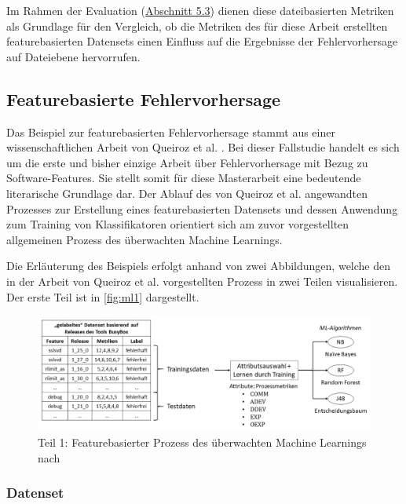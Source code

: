 Im Rahmen der Evaluation (\hyperref[classic-eval]{Abschnitt 5.3}) dienen diese dateibasierten Metriken als Grundlage für den Vergleich, ob die Metriken des für diese Arbeit erstellten featurebasierten Datensets einen Einfluss auf die Ergebnisse der Fehlervorhersage auf Dateiebene hervorrufen. 

\subsection*{Featurebasierte Fehlervorhersage}

Das Beispiel zur featurebasierten Fehlervorhersage stammt aus einer wissenschaftlichen Arbeit von Queiroz et al. \cite{Queiroz2016}. Bei dieser Fallstudie handelt es sich um die erste und bisher einzige Arbeit über Fehlervorhersage mit Bezug zu Software-Features. Sie stellt somit für diese Masterarbeit eine bedeutende literarische Grundlage dar. Der Ablauf des von Queiroz et al. angewandten Prozesses zur Erstellung eines featurebasierten Datensets und dessen Anwendung zum Training von Klassifikatoren orientiert sich am zuvor vorgestellten allgemeinen Prozess des überwachten Machine Learnings.

Die Erläuterung des Beispiels erfolgt anhand von zwei Abbildungen, welche den in der Arbeit von Queiroz et al. vorgestellten Prozess in zwei Teilen visualisieren. Der erste Teil ist in \autoref{fig:ml1} dargestellt.

\begin{figure}[ht]
    \centering
    \captionsetup{justification=centering}
    \includegraphics[width=\textwidth]{images/ML1}
    \caption{Teil 1: Featurebasierter Prozess des überwachten Machine Learnings nach \cite{Queiroz2016}}\label{fig:ml1}
\end{figure}

\subsubsection*{Datenset}

